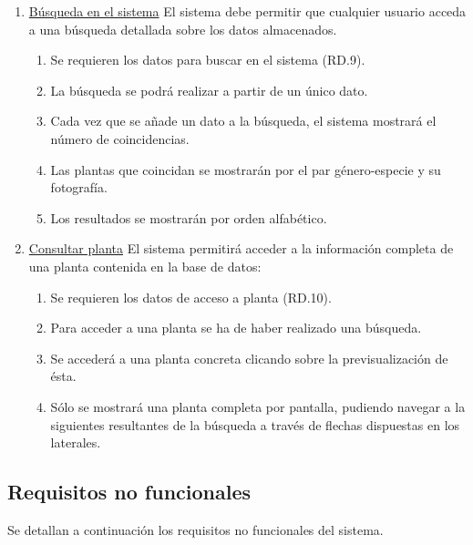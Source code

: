 \documentclass[10pt,a4paper]{article}
\begin{document}
\begin{enumerate}[label=RF\arabic*. ,leftmargin=2.8\parindent]
	\bigskip
	\item \underline{Búsqueda en el sistema}
	\newline \newline
	El sistema debe permitir que cualquier usuario acceda a una búsqueda detallada sobre los datos almacenados.
	\begin{enumerate}[label=-]
		\item Se requieren los datos para buscar en el sistema (RD.9).
		\item La búsqueda se podrá realizar a partir de un único dato.
		\item Cada vez que se añade un dato a la búsqueda, el sistema mostrará el número de coincidencias.
		\item Las plantas que coincidan se mostrarán por el par género-especie y su fotografía.
		\item Los resultados se mostrarán por orden alfabético.
	\end{enumerate}
		
	\bigskip
	\item \underline{Consultar planta}
	\newline \newline
	El sistema permitirá acceder a la información completa de una planta contenida en la base de datos:
	\begin{enumerate}[label=-]
		\item Se requieren los datos de acceso a planta (RD.10).
		\item Para acceder a una planta se ha de haber realizado una búsqueda.
		\item Se accederá a una planta concreta clicando sobre la previsualización de ésta.
		\item Sólo se mostrará una planta completa por pantalla, pudiendo navegar a la siguientes resultantes de la búsqueda a través de flechas dispuestas en los laterales.
	\end{enumerate}
	
\end{enumerate}

\subsection{\textbf{Requisitos no funcionales}}

Se detallan a continuación los requisitos no funcionales del sistema.
\newline
\end{document}
